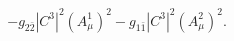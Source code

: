 \begin{equation}
-g_{2\bar{2}}|C^{3}|^2 (A_{\mu}^{1})^2 -g_{1\bar{1}}|C^{3}|^2
(A_{\mu}^{2})^2.
\end{equation}

